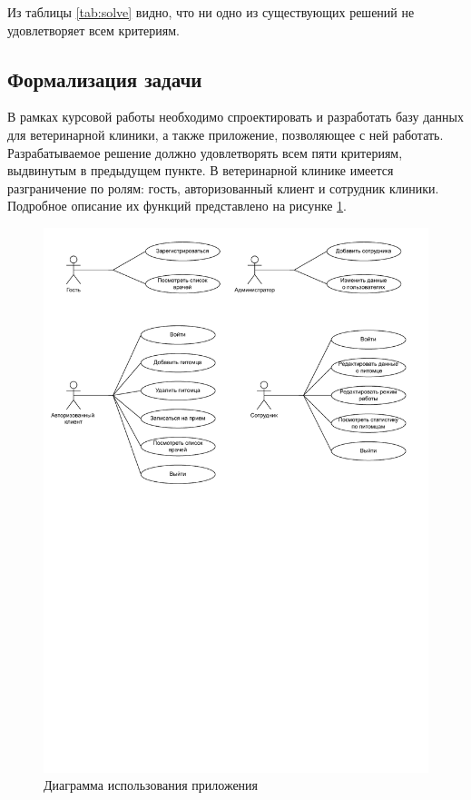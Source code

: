 Из таблицы \ref{tab:solve} видно, что ни одно из существующих решений не удовлетворяет всем критериям.

\subsection{Формализация задачи}

В рамках курсовой работы необходимо спроектировать и разработать базу данных для ветеринарной клиники, а также приложение, позволяющее с ней работать. Разрабатываемое решение должно удовлетворять всем пяти критериям, выдвинутым в предыдущем пункте. В ветеринарной клинике имеется разграничение по ролям: гость, авторизованный клиент и сотрудник клиники. Подробное описание их функций представлено на рисунке \ref{img:use-case}.

\begin{figure}[!h]
	\centering
	\includegraphics[width=\textwidth]{image/use-case.pdf}
	\caption{Диаграмма использования приложения}
	\label{img:use-case}
\end{figure}

